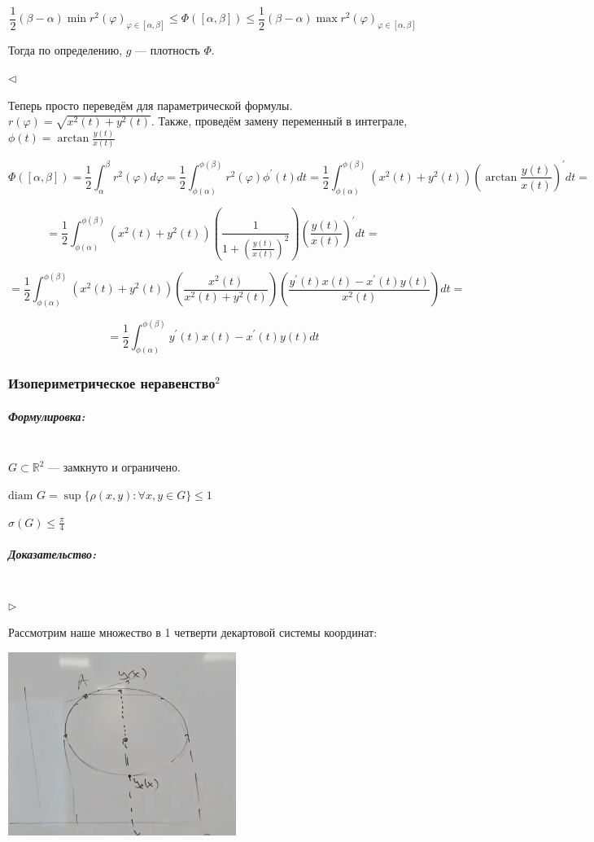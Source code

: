 \documentclass{article}
\let\vanillasubparagraph\subparagraph
\renewcommand{\subparagraph}[1]{\vanillasubparagraph{#1}\mbox{}\\}
\begin{document}
\[\frac{1}{2}(\beta - \alpha) \min{r^2(\varphi)}_{\varphi \in [\alpha, \beta]} \le \Phi([\alpha, \beta]) \le \frac{1}{2}(\beta - \alpha) \max{r^2(\varphi)}_{\varphi \in [\alpha, \beta]}\]

Тогда по определению, $g$ --- плотность $\Phi$.

$\lhd$

Теперь просто переведём для параметрической формулы. $r(\varphi) = \sqrt{x^2(t) + y^2(t)}$. Также, проведём замену переменный в интеграле,
$\phi(t) = \arctan {\frac{y(t)}{x(t)}}$

\[\Phi([\alpha, \beta]) = \frac{1}{2}\int_\alpha^\beta{r^2(\varphi)d\varphi} = \frac{1}{2}\int_{\phi(\alpha)}^{\phi(\beta)}{r^2(\varphi)\phi^\prime(t)dt} = \frac{1}{2}\int_{\phi(\alpha)}^{\phi(\beta)}{(x^2(t) + y^2(t))\left(\arctan {\frac{y(t)}{x(t)}}\right)^\prime dt} = \]

\[ = \frac{1}{2}\int_{\phi(\alpha)}^{\phi(\beta)}{(x^2(t) + y^2(t))\left(\frac{1}{1 + \left(\frac{y(t)}{x(t)}\right)^2}\right)\left(\frac{y(t)}{x(t)}\right)^\prime dt} = \] 

\[ = \frac{1}{2}\int_{\phi(\alpha)}^{\phi(\beta)}{(x^2(t) + y^2(t))\left(\frac{x^2(t)}{x^2(t) + y^2(t)}\right)\left(\frac{y^\prime(t)x(t) - x^\prime(t)y(t)}{x^2(t)}\right) dt} = \]

\[ = \frac{1}{2}\int_{\phi(\alpha)}^{\phi(\beta)}{y^\prime(t)x(t) - x^\prime(t)y(t) dt} \]


\subsubsection{Изопериметрическое неравенство\texorpdfstring{$^2$}{}}
\subparagraph{Формулировка:}

$G \subset \mathbb{R}^2$ --- замкнуто и ограничено.

$\text{diam } G = \sup{\{\rho(x, y) : \forall x, y \in G\}} \le 1$

$\sigma(G) \le \frac{\pi}{4}$

\subparagraph{Доказательство:}

$\rhd$

Рассмотрим наше множество в 1 четверти декартовой системы координат:

\includegraphics[]{../images/isoperim1.png}
\end{document}
